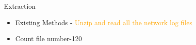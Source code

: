 \documentclass[
 size=14pt,
 paper=smartboard,  %
 mode=present, 		%
 display=slides, 	%
 style=tuliplab,  	%
 pauseslide,
 fleqn,leqno]{powerdot}
\begin{document}
\begin{slide}{Extraction}

\begin{itemize}
\item
Existing Methods - \textcolor{orange}{Unzip and read all the network log files}
\item
Count file number-120

\vspace{1cm}
\end{itemize}

\end{slide}
\end{document}
